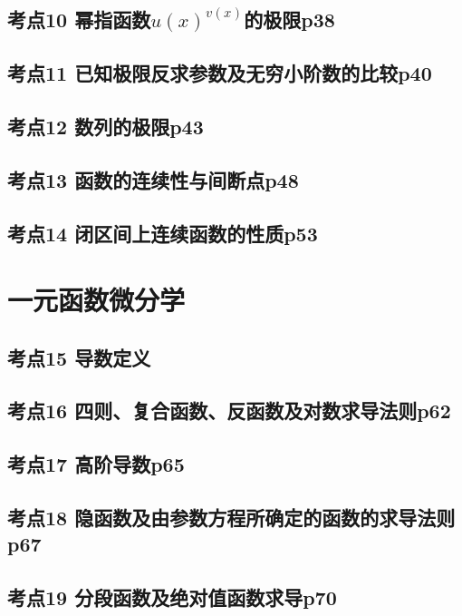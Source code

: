 \section{考点10 幂指函数$u(x)^{v(x)}$的极限p38}

\section{考点11 已知极限反求参数及无穷小阶数的比较p40}

\section{考点12 数列的极限p43}

\section{考点13 函数的连续性与间断点p48}

\section{考点14 闭区间上连续函数的性质p53}

\chapter{一元函数微分学}

\section{考点15 导数定义}

\section{考点16 四则、复合函数、反函数及对数求导法则p62}

\section{考点17 高阶导数p65}

\section{考点18 隐函数及由参数方程所确定的函数的求导法则p67}

\section{考点19 分段函数及绝对值函数求导p70}

